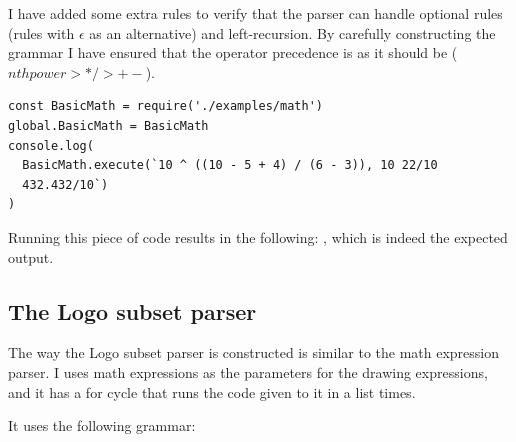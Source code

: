 I have added some extra rules to verify that the parser can handle optional rules (rules with $\epsilon$ as an alternative) and left-recursion. By carefully constructing the grammar I have ensured that the operator precedence is as it should be ($nth power > */ > +-$).


\begin{lstlisting}[frame=single]
const BasicMath = require('./examples/math')
global.BasicMath = BasicMath
console.log(
  BasicMath.execute(`10 ^ ((10 - 5 + 4) / (6 - 3)), 10 22/10
  432.432/10`)
)
\end{lstlisting}

Running this piece of code results in the following: , which is indeed the expected output.

\subsection{The Logo subset parser}
The way the Logo subset parser is constructed is similar to the math expression parser. I uses math expressions as the parameters for the drawing expressions, and it has a for cycle that runs the code given to it in a list  times.

\newpage
It uses the following grammar:


